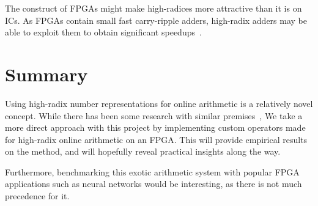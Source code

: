 The construct of FPGAs might make high-radices more attractive than it is on ICs.
As FPGAs contain small fast carry-ripple adders, high-radix adders may be able to exploit them to obtain significant speedups~\cite{Kornerup1}.

\section{Summary}
Using high-radix number representations for online arithmetic is a relatively novel concept.
While there has been some research with similar premises~\cite{Lynch1}\cite{Lynch2}, We take a more direct approach with this project by implementing custom operators made for high-radix online arithmetic on an FPGA.
This will provide empirical results on the method, and will hopefully reveal practical insights along the way.

Furthermore, benchmarking this exotic arithmetic system with popular FPGA applications such as neural networks would be interesting, as there is not much precedence for it.
